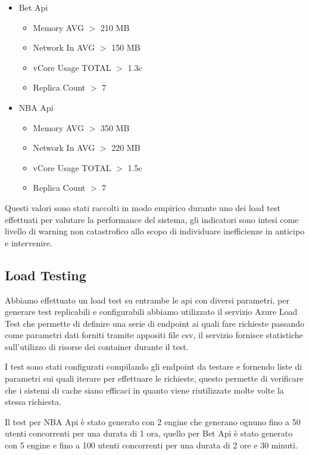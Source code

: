 \begin{itemize}
    \item Bet Api
    \begin{itemize}
        \item Memory AVG $>$ 210 MB
        \item Network In AVG $>$ 150 MB
        \item vCore Usage TOTAL $>$ 1.3c
        \item Replica Count $>$ 7
    \end{itemize}
    \item NBA Api
    \begin{itemize}
        \item Memory AVG $>$ 350 MB
        \item Network In AVG $>$ 220 MB
        \item vCore Usage TOTAL $>$ 1.5c
        \item Replica Count $>$ 7
    \end{itemize}
\end{itemize}

Questi valori sono stati raccolti in modo empirico durante uno dei load test effettuati per valutare la performance del sistema, gli indicatori sono intesi come livello di warning non catastrofico allo scopo di individuare inefficienze in anticipo e intervenire.

\subsection{Load Testing}
Abbiamo effettuato un load test su entrambe le api con diversi parametri, per generare test replicabili e configurabili abbiamo utilizzato il servizio Azure Load Test che permette di definire una serie di endpoint ai quali fare richieste passando come parametri dati forniti tramite appositi file csv, il servizio fornisce statistiche sull'utilizzo di risorse dei container durante il test.

I test sono stati configurati compilando gli endpoint da testare e fornendo liste di parametri sui quali iterare per effettuare le richieste, questo permette di verificare che i sistemi di cache siano efficaci in quanto viene riutilizzate molte volte la stessa richiesta.

Il test per NBA Api è stato generato con 2 engine che generano ognuno fino a 50 utenti concorrenti per una durata di 1 ora, quello per Bet Api è stato generato con 5 engine e fino a 100 utenti concorrenti per una durata di 2 ore e 30 minuti.

